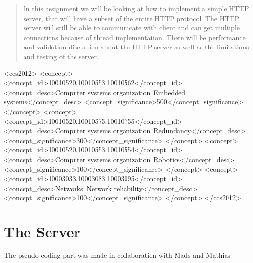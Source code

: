 \documentclass{sig-alternate-05-2015}
\begin{document}

\maketitle
\begin{abstract}
In this assignment we will be looking at how to implement a simple HTTP server, that will have a subset of the entire HTTP protocol. The HTTP server will still be able to communicate with client and can get multiple connections because of thread implementation. There will be performance and validation discussion about the HTTP server as well as the limitations and testing of the server.
\end{abstract}


%
%
\begin{CCSXML}
<ccs2012>
 <concept>
  <concept_id>10010520.10010553.10010562</concept_id>
  <concept_desc>Computer systems organization~Embedded systems</concept_desc>
  <concept_significance>500</concept_significance>
 </concept>
 <concept>
  <concept_id>10010520.10010575.10010755</concept_id>
  <concept_desc>Computer systems organization~Redundancy</concept_desc>
  <concept_significance>300</concept_significance>
 </concept>
 <concept>
  <concept_id>10010520.10010553.10010554</concept_id>
  <concept_desc>Computer systems organization~Robotics</concept_desc>
  <concept_significance>100</concept_significance>
 </concept>
 <concept>
  <concept_id>10003033.10003083.10003095</concept_id>
  <concept_desc>Networks~Network reliability</concept_desc>
  <concept_significance>100</concept_significance>
 </concept>
</ccs2012>
\end{CCSXML}



%
%

%
%




\section{The Server}
The pseudo coding part was made in collaboration with Mads and Mathias
\end{document}
